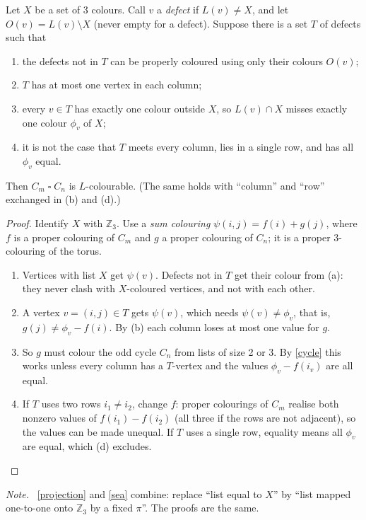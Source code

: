\documentclass[11pt,oneside,openany]{book}
\newcounter{res}[chapter]
\renewcommand{\theres}{\thechapter.\arabic{res}}
\newenvironment{resultbox}[3]{\refstepcounter{res}\begin{tcolorbox}[breakable,colback=#1!5,colframe=#1,
  fonttitle=\bfseries,title={#2 \theres\ifx&#3&\else\ (#3)\fi}]}{\end{tcolorbox}}
\newenvironment{lemma}[1][]{\begin{resultbox}{prc}{Lemma}{#1}}{\end{resultbox}}
\newenvironment{note}{\par\smallskip\noindent\textit{Note.}\ }{\par\smallskip}
\newenvironment{steps}[1][]{\begin{enumerate}[label=\textbf{Step \arabic*.},leftmargin=4.2em,itemsep=0.3em,#1]}{\end{enumerate}}
\newcommand{\T}{\mathbin{\square}}
\newcommand{\Z}{\mathbb{Z}}
\begin{document}
\begin{lemma}[sea lemma]\label{sea}
Let $X$ be a set of 3 colours. Call $v$ a \emph{defect} if $L(v) \ne X$, and let $O(v) = L(v) \setminus X$
(never empty for a defect). Suppose there is a set $T$ of defects such that
\begin{enumerate}[label=(\alph*),nosep]
\item the defects not in $T$ can be properly coloured using only their colours $O(v)$;
\item $T$ has at most one vertex in each column;
\item every $v \in T$ has exactly one colour outside $X$, so $L(v) \cap X$ misses exactly one colour $\phi_v$ of $X$;
\item it is not the case that $T$ meets every column, lies in a single row, and has all $\phi_v$ equal.
\end{enumerate}
Then $C_m \T C_n$ is $L$-colourable. (The same holds with ``column'' and ``row'' exchanged in (b) and (d).)
\end{lemma}

\begin{proof}
Identify $X$ with $\Z_3$. Use a \emph{sum colouring} $\psi(i, j) = f(i) + g(j)$, where $f$ is a proper colouring
of $C_m$ and $g$ a proper colouring of $C_n$; it is a proper 3-colouring of the torus.
\begin{steps}
\item Vertices with list $X$ get $\psi(v)$. Defects not in $T$ get their colour from (a): they never clash with
$X$-coloured vertices, and not with each other.
\item A vertex $v = (i, j) \in T$ gets $\psi(v)$, which needs $\psi(v) \ne \phi_v$, that is, $g(j) \ne \phi_v - f(i)$. By (b)
each column loses at most one value for $g$.
\item So $g$ must colour the odd cycle $C_n$ from lists of size 2 or 3. By \ref{cycle} this works unless every column
has a $T$-vertex and the values $\phi_v - f(i_v)$ are all equal.
\item If $T$ uses two rows $i_1 \ne i_2$, change $f$: proper colourings of $C_m$ realise both nonzero values of
$f(i_1) - f(i_2)$ (all three if the rows are not adjacent), so the values can be made unequal. If $T$ uses a single
row, equality means all $\phi_v$ are equal, which (d) excludes. \qedhere
\end{steps}
\end{proof}

\begin{note}
\ref{projection} and \ref{sea} combine: replace ``list equal to $X$'' by ``list mapped one-to-one onto $\Z_3$ by a
fixed $\pi$''. The proofs are the same.
\end{note}
\end{document}
